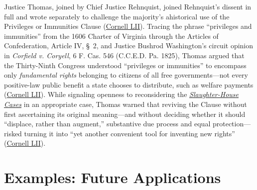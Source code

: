 \documentclass[12pt]{article}
\begin{document}
Justice Thomas, joined by Chief Justice Rehnquist, joined Rehnquist's dissent in full and wrote separately to challenge the majority's ahistorical use of the Privileges or Immunities Clause (\href{https://www.law.cornell.edu/supct/html/98-97.ZD1.html}{Cornell LII}). Tracing the phrase ``privileges and immunities'' from the 1606 Charter of Virginia through the Articles of Confederation, Article IV, \S~2, and Justice Bushrod Washington's circuit opinion in \textit{Corfield v. Coryell}, 6 F. Cas. 546 (C.C.E.D. Pa. 1825), Thomas argued that the Thirty-Ninth Congress understood ``privileges or immunities'' to encompass only \emph{fundamental rights} belonging to citizens of all free governments---not every positive-law public benefit a state chooses to distribute, such as welfare payments (\href{https://www.law.cornell.edu/supct/html/98-97.ZD1.html}{Cornell LII}). While signaling openness to reconsidering the \href{https://www.law.cornell.edu/supremecourt/text/83/36}{\textit{Slaughter-House Cases}} in an appropriate case, Thomas warned that reviving the Clause without first ascertaining its original meaning---and without deciding whether it should ``displace, rather than augment,'' substantive due process and equal protection---risked turning it into ``yet another convenient tool for inventing new rights'' (\href{https://www.law.cornell.edu/supct/html/98-97.ZD1.html}{Cornell LII}).

\section{Examples: Future Applications}
\end{document}

